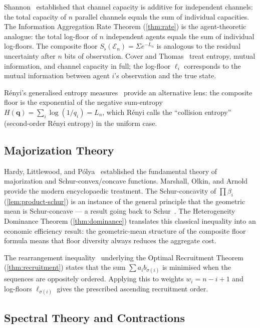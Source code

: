 \documentclass[twocolumn,11pt,a4paper]{article}
\theoremstyle{remark}
\newcommand{\Sflat}{S_{\flat}}
\newcommand{\Ens}{\mathcal{E}}
\newcommand{\logfl}{\ell}                 %
\newcommand{\Logfl}{L}                    %
\begin{document}
Shannon~\cite{shannon1948} established that channel capacity is additive for
independent channels: the total capacity of $n$ parallel channels equals the
sum of individual capacities.  The Information Aggregation Rate Theorem
(\cref{thm:rate}) is the agent-theoretic analogue: the total log-floor of $n$
independent agents equals the sum of individual log-floors.  The composite
floor $\Sflat(\Ens_n) = \Sigma e^{-\Logfl_n}$ is analogous to the residual
uncertainty after $n$ bits of observation.  Cover and Thomas~\cite{cover2006}
treat entropy, mutual information, and channel capacity in full; the
log-floor $\logfl_i$ corresponds to the mutual information between agent $i$'s
observation and the true state.

R\'enyi's generalised entropy measures~\cite{renyi1961} provide an alternative
lens: the composite floor is the exponential of the negative sum-entropy
$H(\boldsymbol q) = \sum_i \log(1/q_i) = \Logfl_n$, which R\'enyi calls the
``collision entropy'' (second-order R\'enyi entropy) in the uniform case.

\subsection{Majorization Theory}
\label{sec:lit:major}

Hardy, Littlewood, and P\'olya~\cite{hlp1952} established the fundamental
theory of majorization and Schur-convex/concave functions.  Marshall, Olkin,
and Arnold~\cite{marshall2011} provide the modern encyclopaedic treatment.
The Schur-concavity of $\prod \beta_i$ (\cref{lem:product-schur}) is an
instance of the general principle that the geometric mean is Schur-concave —
a result going back to Schur~\cite{schur1923}.  The Heterogeneity Dominance
Theorem (\cref{thm:dominance}) translates this classical inequality into an
economic efficiency result: the geometric-mean structure of the composite floor
formula means that floor diversity always reduces the aggregate cost.

The rearrangement inequality~\cite{hlp1952} underlying the Optimal Recruitment
Theorem (\cref{thm:recruitment}) states that the sum $\sum a_i b_{\sigma(i)}$
is minimised when the sequences are oppositely ordered.  Applying this to
weights $w_i = n-i+1$ and log-floors $\logfl_{\sigma(i)}$ gives the
prescribed ascending recruitment order.

\subsection{Spectral Theory and Contractions}
\label{sec:lit:spectral}
\end{document}
